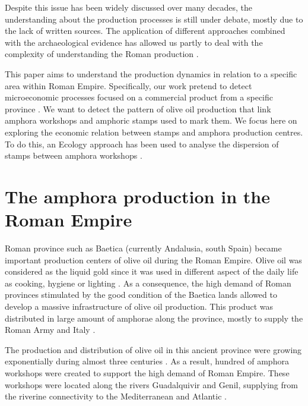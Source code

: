 \documentclass[review]{elsarticle}
\begin{document}
Despite this issue has been widely discussed over many decades, the understanding about the production processes is still under debate, mostly due to the lack of written sources. The application of different approaches combined with the archaeological evidence has allowed us partly to deal with the complexity of understanding the Roman production \citep{orengo_seeds_2016,brughmans_roman_2016,coto-sarmiento_maria_bayesian_????}.

This paper aims to understand the production dynamics in relation to a specific area within Roman Empire. Specifically, our work pretend to detect microeconomic processes focused on a commercial product from a specific province \citep{isaksen_network_2006}. We want to detect the pattern of olive oil production that link amphora workshops and amphoric stamps used to mark them. We focus here on exploring the economic relation between stamps and amphora production centres. To do this, an Ecology approach has been used to analyse the dispersion of stamps between amphora workshops \citep{rubio-campillo_ecology_2018}. 



 


\section{The amphora production in the Roman Empire}

Roman province such as Baetica (currently Andalusia, south Spain) became important production centers of olive oil during the Roman Empire. Olive oil was considered as the liquid gold since it was used in different aspect of the daily life as cooking, hygiene or lighting  \citep{mattingly_d.j._oil_1988}. As a consequence, the high demand of Roman provinces stimulated by the good condition of the Baetica lands allowed to develop a massive infrastructure of olive oil production. This product was distributed in large amount of amphorae along the province, mostly to supply the Roman Army and Italy \citep{blazquez_exportacion_1980}. 

The production and distribution of olive oil in this ancient province were growing exponentially during almost three centuries \citep{remesal_concierto}. As a result, hundred of amphora workshops were created to support the high demand of Roman Empire. These workshops were located along the rivers Guadalquivir and Genil, supplying from the riverine connectivity to the Mediterranean and Atlantic \citep{garcia_vargas_enrique_formal_2010}. 
\end{document}

